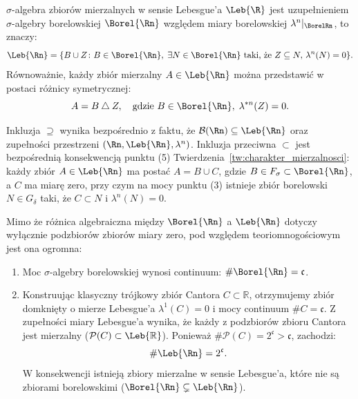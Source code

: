 \begin{tw}
    $\sigma$-algebra zbiorów mierzalnych w sensie Lebesgue'a $\Leb{\R}$ jest uzupełnieniem $\sigma$-algebry borelowskiej $\Borel{\Rn}$ względem miary borelowskiej $\lambda^n|_{\BorelRn}$, to znaczy:
    \begin{equation*}
        \Leb{\Rn} = \{B \cup Z \colon B \in \Borel{\Rn}, \; \exists N \in \Borel{\Rn} \text{ taki, że } Z \subseteq N, \, \lambda^n(N) = 0\}.
    \end{equation*}
    Równoważnie, każdy zbiór mierzalny $A \in \Leb{\Rn}$ można przedstawić w postaci różnicy symetrycznej:
    \begin{equation*}
        A = B \mathbin{\triangle} Z, \quad \text{gdzie } B \in \Borel{\Rn}, \; \lambda^{*n}(Z) = 0.
    \end{equation*}
\end{tw}

\begin{dow}
    Inkluzja $\supseteq $ wynika bezpośrednio z faktu, że $\mathcal{B}(\Rn) \subseteq \Leb{\Rn}$ oraz zupełności przestrzeni $(\Rn, \Leb{\Rn}, \lambda^n)$.
    Inkluzja przeciwna $\subset$ jest bezpośrednią konsekwencją punktu (5) Twierdzenia~\ref{tw:charakter_mierzalnosci}: każdy zbiór $A \in \Leb{\Rn}$ ma postać $A = B \cup C$, gdzie $B \in F_\sigma \subset \Borel{\Rn}$, a $C$ ma miarę zero, przy czym na mocy punktu (3) istnieje zbiór borelowski $N \in G_\delta$ taki, że $C \subset N$ i $\lambda^n(N) = 0$.
\end{dow}

\begin{uwaga}
    Mimo że różnica algebraiczna między $\Borel{\Rn}$ a $\Leb{\Rn}$ dotyczy wyłącznie podzbiorów zbiorów miary zero, pod względem teoriomnogościowym jest ona ogromna:
    \begin{enumerate}
        \item Moc $\sigma$-algebry borelowskiej wynosi continuum: $\#\Borel{\Rn} = \mathfrak{c}$.
        \item Konstruując klasyczny trójkowy zbiór Cantora $C \subset \mathbb{R}$, otrzymujemy zbiór domknięty o mierze Lebesgue'a $\lambda^1(C) = 0$ i mocy continuum $\#C = \mathfrak{c}$. Z zupełności miary Lebesgue'a wynika, że każdy z podzbiorów zbioru Cantora jest mierzalny ($\mathcal{P}(C) \subset \Leb{\mathbb{R}}$). Ponieważ $\#\mathcal{P}(C) = 2^\mathfrak{c} > \mathfrak{c}$, zachodzi:
              \begin{equation*}
                  \#\Leb{\Rn} = 2^\mathfrak{c}.
              \end{equation*}
              W konsekwencji istnieją zbiory mierzalne w sensie Lebesgue'a, które nie są zbiorami borelowskimi ($\Borel{\Rn} \subsetneq \Leb{\Rn}$).
    \end{enumerate}
\end{uwaga}

